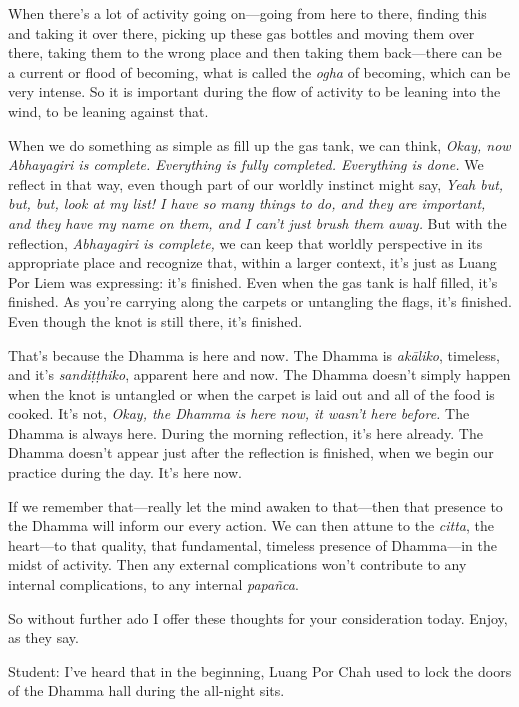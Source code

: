 When there's a lot of activity going on---going from here to there, 
finding this and taking it over there, picking up these gas bottles and 
moving them over there, taking them to the wrong place and then taking 
them back---there can be a current or flood of becoming, what is called 
the \emph{ogha} of becoming, which can be very intense. So it is 
important during the flow of activity to be leaning into the wind, to 
be leaning against that.

When we do something as simple as fill up the gas tank, we can think, 
\emph{Okay, now Abhayagiri is complete. Everything is fully completed. 
Everything is done.} We reflect in that way, even though part of our 
worldly instinct might say, \emph{Yeah but, but, but, look at my list! 
I have so many things to do, and they are important, and they have my 
name on them, and I can't just brush them away.} But with the 
reflection, \emph{Abhayagiri is complete,} we can keep that worldly 
perspective in its appropriate place and recognize that, within a 
larger context, it's just as Luang Por Liem was expressing: it's 
finished. Even when the gas tank is half filled, it's finished. As 
you're carrying along the carpets or untangling the flags, it's 
finished. Even though the knot is still there, it's finished.

That's because the Dhamma is here and now. The Dhamma is 
\emph{akāliko}, timeless, and it's \emph{sandiṭṭhiko}, apparent 
here and now. The Dhamma doesn't simply happen when the knot is 
untangled or when the carpet is laid out and all of the food is cooked. 
It's not, \emph{Okay, the Dhamma is here now, it wasn't here before.} 
The Dhamma is always here. During the morning reflection, it's here 
already. The Dhamma doesn't appear just after the reflection is 
finished, when we begin our practice during the day. It's here now.

If we remember that---really let the mind awaken to that---then that 
presence to the Dhamma will inform our every action. We can then attune 
to the \emph{citta}, the heart---to that quality, that fundamental, 
timeless presence of Dhamma---in the midst of activity. Then any 
external complications won't contribute to any internal complications, 
to any internal \emph{papañca}.

So without further ado I offer these thoughts for your consideration 
today. Enjoy, as they say.


Student: I've heard that in the beginning, Luang Por Chah used to lock 
the doors of the Dhamma hall during the all-night sits.

